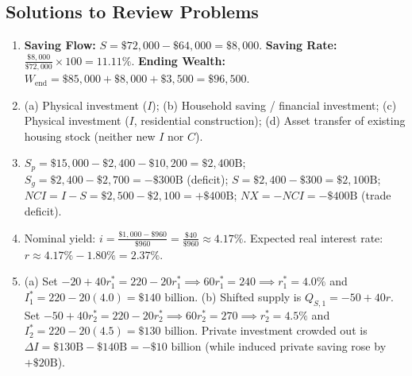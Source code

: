 \documentclass[11pt,letterpaper]{article}
\begin{document}
\subsection*{Solutions to Review Problems}
\begin{enumerate}
  \item \textbf{Saving Flow:} $S = \$72{,}000 - \$64{,}000 = \$8{,}000$. \textbf{Saving Rate:} $\frac{\$8{,}000}{\$72{,}000} \times 100 = 11.11\%$. \textbf{Ending Wealth:} $W_{\text{end}} = \$85{,}000 + \$8{,}000 + \$3{,}500 = \$96{,}500$.
  \item (a) Physical investment ($I$); (b) Household saving / financial investment; (c) Physical investment ($I$, residential construction); (d) Asset transfer of existing housing stock (neither new $I$ nor $C$).
  \item $S_p = \$15{,}000 - \$2{,}400 - \$10{,}200 = \$2{,}400\text{B}$; $S_g = \$2{,}400 - \$2{,}700 = -\$300\text{B}$ (deficit); $S = \$2{,}400 - \$300 = \$2{,}100\text{B}$; $NCI = I - S = \$2{,}500 - \$2{,}100 = +\$400\text{B}$; $NX = -NCI = -\$400\text{B}$ (trade deficit).
  \item Nominal yield: $i = \frac{\$1{,}000 - \$960}{\$960} = \frac{\$40}{\$960} \approx 4.17\%$. Expected real interest rate: $r \approx 4.17\% - 1.80\% = 2.37\%$.
  \item (a) Set $-20 + 40r_1^* = 220 - 20r_1^* \implies 60r_1^* = 240 \implies r_1^* = 4.0\%$ and $I_1^* = 220 - 20(4.0) = \$140\text{ billion}$. (b) Shifted supply is $Q_{S,1} = -50 + 40r$. Set $-50 + 40r_2^* = 220 - 20r_2^* \implies 60r_2^* = 270 \implies r_2^* = 4.5\%$ and $I_2^* = 220 - 20(4.5) = \$130\text{ billion}$. Private investment crowded out is $\Delta I = \$130\text{B} - \$140\text{B} = -\$10\text{ billion}$ (while induced private saving rose by $+\$20\text{B}$).
\end{enumerate}
\end{document}
